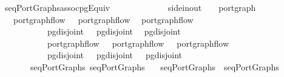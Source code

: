 \ seqPortGraphs{\isacharunderscore}assoc{\isacharunderscore}pgEquiv{\isacharcolon}\isanewline
\ \ \ \ \ \ \ \ \ \ {\isacharcolon}{\isacharcolon}\ {\isachardoublequoteopen}{\isacharparenleft}\ {\isacharcolon}{\isacharcolon}\ side{\isacharunderscore}in{\isacharunderscore}out{\isacharcomma}\ \ \ \ port{\isacharunderscore}graph{\isachardoublequoteclose}\isanewline
\ \ \ {\isachardoublequoteopen}port{\isacharunderscore}graph{\isacharunderscore}flow\ \ \ {\isachardoublequoteopen}port{\isacharunderscore}graph{\isacharunderscore}flow\  \ {\isachardoublequoteopen}port{\isacharunderscore}graph{\isacharunderscore}flow\ \isanewline
\ \ \ \ \ \ \ \ \ \ \ {\isachardoublequoteopen}pg{\isacharunderscore}disjoint\ \ \ {\isachardoublequoteopen}pg{\isacharunderscore}disjoint\  \ {\isachardoublequoteopen}pg{\isacharunderscore}disjoint\ \isanewline
\ \ \ \ \ \ \ \ \ \ \ {\isachardoublequoteopen}port{\isacharunderscore}graph{\isacharunderscore}flow\ \ \ {\isachardoublequoteopen}port{\isacharunderscore}graph{\isacharunderscore}flow\ \ \ {\isachardoublequoteopen}port{\isacharunderscore}graph{\isacharunderscore}flow\ \isanewline
\ \ \ \ \ \ \ \ \ \ \ {\isachardoublequoteopen}pg{\isacharunderscore}disjoint\ \ \ {\isachardoublequoteopen}pg{\isacharunderscore}disjoint\ \ \ {\isachardoublequoteopen}pg{\isacharunderscore}disjoint\ \isanewline
\ \ \ \ \ \ \ \ \ \ \ {\isachardoublequoteopen}\ {\isasymapprox}\ \ \ {\isachardoublequoteopen}\ {\isasymapprox}\ \ \ {\isachardoublequoteopen}\ {\isasymapprox}\ \isanewline
\ \ \ \ \ \ \ {\isachardoublequoteopen}seqPortGraphs\ {\isacharparenleft}seqPortGraphs\ \ \ {\isasymapprox}\isanewline
{}seqPortGraphs\ \ {\isacharparenleft}seqPortGraphs\ 
